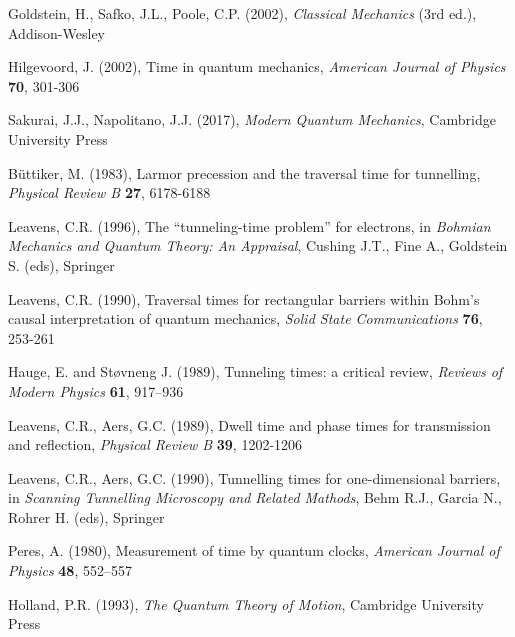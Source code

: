 \documentclass{article}
\begin{document}
\clearpage

\begin{thebibliography}{100}
Goldstein, H., Safko, J.L., Poole, C.P. (2002), \textit{Classical Mechanics} (3rd ed.), Addison-Wesley

Hilgevoord, J. (2002), Time in quantum mechanics, \textit{American Journal of Physics} \textbf{70}, 301-306

Sakurai, J.J., Napolitano, J.J. (2017), \textit{Modern Quantum Mechanics}, Cambridge University Press

B{\"u}ttiker, M. (1983), Larmor precession and the traversal time for tunnelling, \textit{Physical Review B} \textbf{27}, 6178-6188

Leavens, C.R. (1996), The “tunneling-time problem” for electrons, in \textit{Bohmian Mechanics and Quantum Theory: An Appraisal}, Cushing J.T., Fine A., Goldstein S. (eds), Springer

Leavens, C.R. (1990), Traversal times for rectangular barriers within Bohm's causal interpretation of quantum mechanics, \textit{Solid State Communications} \textbf{76}, 253-261

Hauge, E. and St{\o}vneng J. (1989), Tunneling times: a critical review, \textit{Reviews of Modern Physics} \textbf{61}, 917–936

Leavens, C.R., Aers, G.C. (1989), Dwell time and phase times for transmission and reflection, \textit{Physical Review B} \textbf{39}, 1202-1206

Leavens, C.R., Aers, G.C. (1990), Tunnelling times for one-dimensional barriers, in \textit{Scanning Tunnelling Microscopy and Related Mathods}, Behm R.J., Garcia N., Rohrer H. (eds), Springer

Peres, A. (1980), Measurement of time by quantum clocks, \textit{American Journal of Physics} \textbf{48}, 552–557

Holland, P.R. (1993), \textit{The Quantum Theory of Motion}, Cambridge University Press



\end{thebibliography}
\end{document}

